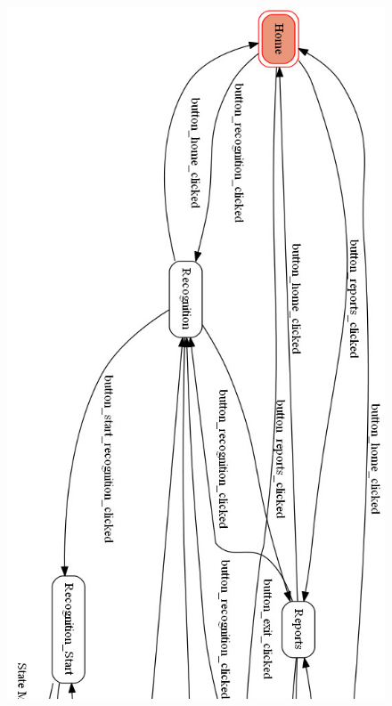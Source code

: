 \documentclass[a4paper, 12pt]{report}
\begin{document}
	\begin{figure}[H]
		\vfill
		\begin{center}
			\includegraphics[width=\textwidth,height=\textheight,keepaspectratio]{images/state_diagram_001.jpg}
		\end{center}
		\vfill
	\end{figure}
\end{document}
